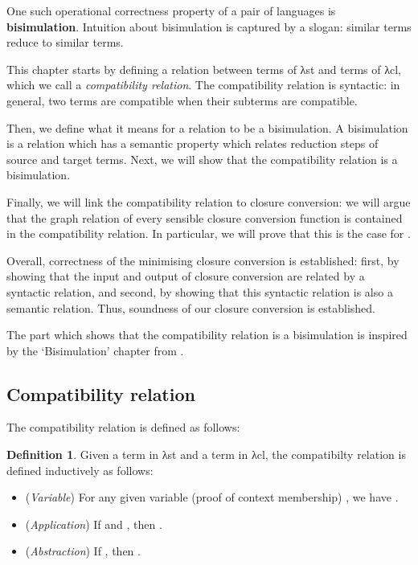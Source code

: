 \documentclass[bsc,frontabs,oneside,singlespacing,parskip,deptreport]{infthesis}
\theoremstyle{definition}
\newtheorem*{definition}{Definition}
\theoremstyle{lemma}
\begin{document}
One such operational correctness property of a pair of languages is
\textbf{bisimulation}. Intuition about bisimulation is captured by a
slogan: similar terms reduce to similar terms. 

This chapter starts by defining a relation between terms of λst and
terms of λcl, which we call a \textit{compatibility relation}. The
compatibility relation is syntactic: in general, two terms are
compatible when their subterms are compatible.

Then, we define what it means for a relation to be a bisimulation. A
bisimulation is a relation which has a semantic property which relates
reduction steps of source and target terms. Next, we will show that
the compatibility relation is a bisimulation.

Finally, we will link the compatibility relation to closure
conversion: we will argue that the graph relation of every sensible
closure conversion function is contained in the compatibility
relation. In particular, we will prove that this is the case for
.

Overall, correctness of the minimising closure conversion is
established: first, by showing that the input and output of closure
conversion are related by a syntactic relation, and second, by showing
that this syntactic relation is also a semantic relation. Thus,
soundness of our closure conversion is established.

The part which shows that the compatibility relation is a bisimulation
is inspired by the `Bisimulation' chapter from
\cite{DBLP:conf/sbmf/Wadler18}. 

\subsection{Compatibility relation}
\label{sec:comp-rel}

The compatibility relation is defined as follows:

\begin{definition}
  Given a term  in λst and a term  in λcl,
  the compatibilty relation  is defined inductively as
  follows:

  \begin{itemize}
  \item (\textit{Variable}) For any given variable (proof of context
    membership) , we have .

  \item (\textit{Application}) If  and ,
    then .

  \item (\textit{Abstraction}) If , then
    .
    
  \end{itemize}
\end{definition}
\end{document}
